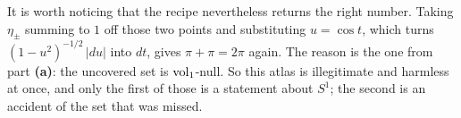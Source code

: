 \begin{exercisesolution}
\begin{enumerate}[label=\textbf{(\alph*)}]
    It is worth noticing that the recipe nevertheless returns the right number. Taking
    $\eta_\pm$ summing to $1$ off those two points and substituting $u = \cos t$, which turns
    $(1-u^2)^{-1/2}\,\lvert du\rvert$ into $dt$, gives $\pi + \pi = 2\pi$ again. The reason is the
    one from part \textbf{(a)}: the uncovered set is $\operatorname{vol}_1$-null. So this atlas is illegitimate
    and harmless at once, and only the first of those is a statement about $S^1$; the second is
    an accident of the set that was missed.
\end{enumerate}
\end{exercisesolution}

